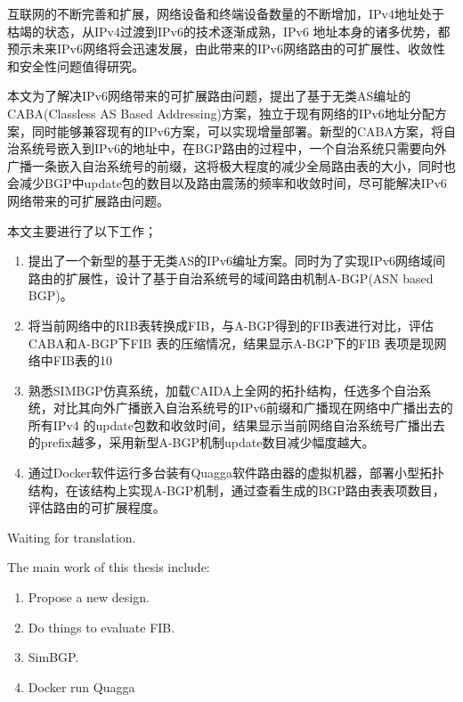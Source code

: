 \begin{cabstract}
  互联网的不断完善和扩展，网络设备和终端设备数量的不断增加，IPv4地址处于枯竭的状态，从IPv4过渡到IPv6的技术逐渐成熟，IPv6 地址本身的诸多优势，都预示未来IPv6网络将会迅速发展，由此带来的IPv6网络路由的可扩展性、收敛性和安全性问题值得研究。

  本文为了解决IPv6网络带来的可扩展路由问题，提出了基于无类AS编址的CABA(Classless AS Based Addressing)方案，独立于现有网络的IPv6地址分配方案，同时能够兼容现有的IPv6方案，可以实现增量部署。新型的CABA方案，将自治系统号嵌入到IPv6的地址中，在BGP路由的过程中，一个自治系统只需要向外广播一条嵌入自治系统号的前缀，这将极大程度的减少全局路由表的大小，同时也会减少BGP中update包的数目以及路由震荡的频率和收敛时间，尽可能解决IPv6网络带来的可扩展路由问题。

  本文主要进行了以下工作；

  \begin{enumerate}
  \item 提出了一个新型的基于无类AS的IPv6编址方案。同时为了实现IPv6网络域间路由的扩展性，设计了基于自治系统号的域间路由机制A-BGP(ASN based BGP)。
  \item 将当前网络中的RIB表转换成FIB，与A-BGP得到的FIB表进行对比，评估CABA和A-BGP下FIB 表的压缩情况，结果显示A-BGP下的FIB 表项是现网络中FIB表的10%
  \item 熟悉SIMBGP仿真系统，加载CAIDA上全网的拓扑结构，任选多个自治系统，对比其向外广播嵌入自治系统号的IPv6前缀和广播现在网络中广播出去的所有IPv4 的update包数和收敛时间，结果显示当前网络自治系统号广播出去的prefix越多，采用新型A-BGP机制update数目减少幅度越大。
  \item 通过Docker软件运行多台装有Quagga软件路由器的虚拟机器，部署小型拓扑结构，在该结构上实现A-BGP机制，通过查看生成的BGP路由表表项数目，评估路由的可扩展程度。
  \end{enumerate}
\end{cabstract}


\begin{eabstract}
Waiting for translation.

The main work of this thesis include:
\begin{enumerate}
\item Propose a new design.
\item Do things to evaluate FIB.
\item SimBGP.
\item Docker run Quagga
\end{enumerate}
\end{eabstract}

